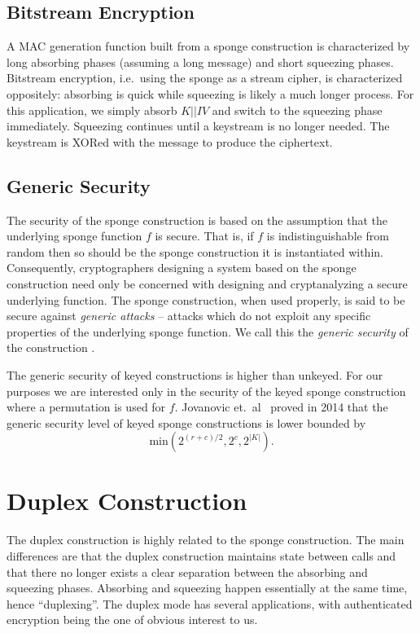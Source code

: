 \subsection{Bitstream Encryption}
A MAC generation function built from a sponge construction is characterized by long absorbing phases (assuming a long message) and short squeezing phases.
Bitstream encryption, i.e.\ using the sponge as a stream cipher, is characterized oppositely: absorbing is quick while squeezing is likely a much longer process.
For this application, we simply absorb $K||IV$ and switch to the squeezing phase immediately.
Squeezing continues until a keystream is no longer needed.
The keystream is XORed with the message to produce the ciphertext.

\subsection{Generic Security}
The security of the sponge construction is based on the assumption that the underlying sponge function $f$ is secure.
That is, if $f$ is indistinguishable from random then so should be the sponge construction it is instantiated within.
Consequently, cryptographers designing a system based on the sponge construction need only be concerned with designing and cryptanalyzing a secure underlying function.
The sponge construction, when used properly, is said to be secure against \emph{generic attacks} -- attacks which do not exploit any specific properties of the underlying sponge function.
We call this the \emph{generic security} of the construction \cite{Bertoni2011_SpongeFunctions}.

The generic security of keyed constructions is higher than unkeyed.
For our purposes we are interested only in the security of the keyed sponge construction where a permutation is used for $f$. 
Jovanovic et.~al\ \cite{Jovanovic2014_Beyond} proved in 2014 that the generic security level of keyed sponge constructions is lower bounded by 
\begin{equation*}
\mathrm{min}(2^{(r+c)/2}, 2^c, 2^{|K|}).
\end{equation*} 

\section{Duplex Construction}
The duplex construction is highly related to the sponge construction.
The main differences are that the duplex construction maintains state between calls and that there no longer exists a clear separation between the absorbing and squeezing phases.
Absorbing and squeezing happen essentially at the same time, hence ``duplexing''.
The duplex mode has several applications, with authenticated encryption being the one of obvious interest to us.

